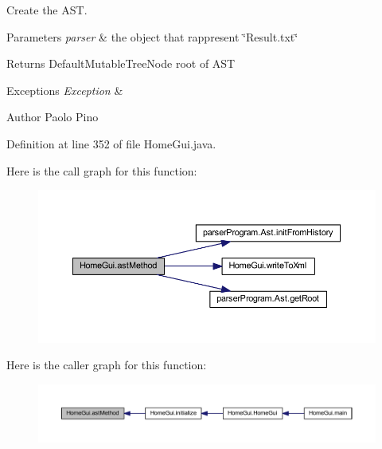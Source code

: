 Create the A\-S\-T. 


\begin{DoxyParams}{Parameters}
{\em parser} & the object that rappresent \char`\"{}\-Result.\-txt\char`\"{} \\
\hline
\end{DoxyParams}
\begin{DoxyReturn}{Returns}
Default\-Mutable\-Tree\-Node root of A\-S\-T 
\end{DoxyReturn}

\begin{DoxyExceptions}{Exceptions}
{\em Exception} & \\
\hline
\end{DoxyExceptions}
\begin{DoxyAuthor}{Author}
Paolo Pino 
\end{DoxyAuthor}


Definition at line 352 of file Home\-Gui.\-java.



Here is the call graph for this function\-:
\nopagebreak
\begin{figure}[H]
\begin{center}
\leavevmode
\includegraphics[width=350pt]{class_home_gui_ac44ac869c6c437c200139d79f9f9b027_cgraph}
\end{center}
\end{figure}




Here is the caller graph for this function\-:
\nopagebreak
\begin{figure}[H]
\begin{center}
\leavevmode
\includegraphics[width=350pt]{class_home_gui_ac44ac869c6c437c200139d79f9f9b027_icgraph}
\end{center}
\end{figure}


